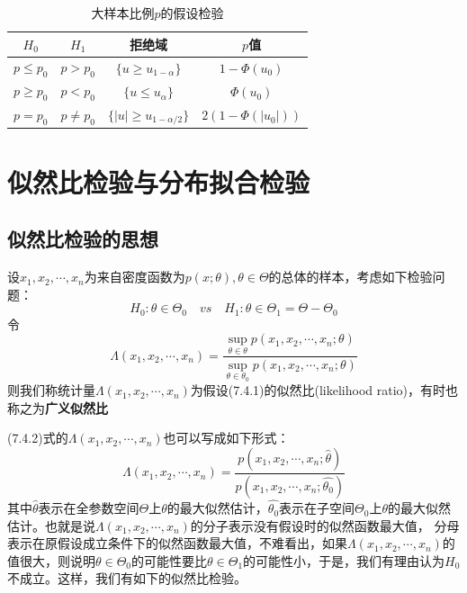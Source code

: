\begin{table}[H]
    \centering
    \caption{大样本比例$p$的假设检验}
    \begin{tabular}{@{}cccc@{}}
    \toprule
   $H_0$ & $H_1$ &拒绝域 &$p$值\\ 
   \midrule
   $p \leq p_0$  &  $p > p_0$&  $\{u\geq u_{1-\alpha} \}$& $1-\Phi(u_0)$ \\
   $p \geq p_0$ &  $p < p_0$ &$\{ u \leq u_{\alpha}\} $& $\Phi(u_0) $ \\ 
   $p = p_0$&  $p \neq p_0$&$\{ |u| \geq u_{1-\alpha/2} \}$ &$ 2(1-\Phi(|u_0|)) $ \\
   \bottomrule
    \end{tabular}
\end{table}
\section{似然比检验与分布拟合检验}
\subsection{似然比检验的思想}
\begin{definition}
    设$x_{1},x_{2},\cdots,x_{n}$为来自密度函数为$p(x;\theta),\theta \in \Theta$的总体的样本，考虑如下检验问题：
    \begin{equation}
        H_{0}:\theta \in \Theta_{0} \quad vs \quad H_{1}:\theta \in \Theta_{1}=\Theta-\Theta_0
    \end{equation}
    令
    \begin{equation}
        \Lambda(x_{1},x_{2},\cdots,x_{n})=
        \frac{\sup_{\theta\in\theta}p(x_{1},x_{2},\cdots,x_{n};\theta)}
        {\sup_{\theta\in\theta_{0}}p(x_{1},x_{2},\cdots,x_{n};\theta)}
    \end{equation}
    则我们称统计量$\Lambda(x_{1},x_{2},\cdots,x_{n})$为假设(7.4.1)的似然比(likelihood ratio)，有时也称之为\textbf{广义似然比}
\end{definition}
(7.4.2)式的$\Lambda(x_{1},x_{2},\cdots,x_{n})$也可以写成如下形式：
\begin{equation}
    \Lambda(x_{1},x_{2},\cdots,x_{n})=
    \frac{p(x_{1},x_{2},\cdots,x_{n};\hat{\theta})}
    {p(x_{1},x_{2},\cdots,x_{n};\hat{\theta_0})}
\end{equation}
其中$\hat{\theta}$表示在全参数空间$\Theta$上$\theta$的最大似然估计，$\hat{\theta_0}$表示在子空间$\Theta_0$上$\theta$的最大似然估计。也就是说$\Lambda(x_{1},x_{2},\cdots,x_{n})$的分子表示没有假设时的似然函数最大值， 分母表示在原假设成立条件下的似然函数最大值，不难看出，如果$\Lambda(x_{1},x_{2},\cdots,x_{n})$的值很大，则说明$\theta \in \Theta_0$的可能性要比$\theta \in \Theta_1$的可能性小，于是，我们有理由认为$H_0$不成立。这样，我们有如下的似然比检验。

